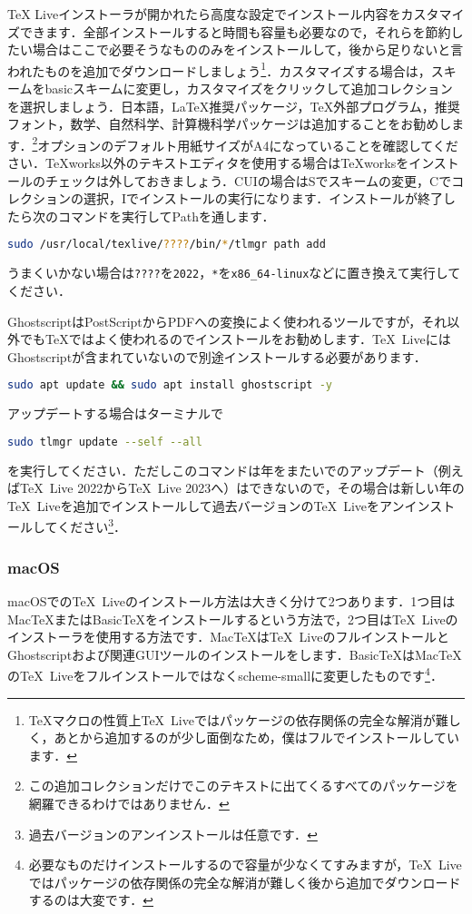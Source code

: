 TeX Liveインストーラが開かれたら高度な設定でインストール内容をカスタマイズできます．全部インストールすると時間も容量も必要なので，それらを節約したい場合はここで必要そうなもののみをインストールして，後から足りないと言われたものを追加でダウンロードしましょう\footnote{\TeX マクロの性質上\TeX\ Liveではパッケージの依存関係の完全な解消が難しく，あとから追加するのが少し面倒なため，僕はフルでインストールしています．}．カスタマイズする場合は，スキームをbasicスキームに変更し，カスタマイズをクリックして追加コレクションを選択しましょう．日本語，LaTeX推奨パッケージ，TeX外部プログラム，推奨フォント，数学、自然科学、計算機科学パッケージは追加することをお勧めします．\footnote{この追加コレクションだけでこのテキストに出てくるすべてのパッケージを網羅できるわけではありません．}オプションのデフォルト用紙サイズがA4になっていることを確認してください．TeXworks以外のテキストエディタを使用する場合はTeXworksをインストールのチェックは外しておきましょう．CUIの場合はSでスキームの変更，Cでコレクションの選択，Iでインストールの実行になります．インストールが終了したら次のコマンドを実行してPathを通します．
\begin{lstlisting}[language=bash]
sudo /usr/local/texlive/????/bin/*/tlmgr path add
\end{lstlisting}
うまくいかない場合は\texttt{????}を\texttt{2022}，\texttt{*}を\texttt{x86\_64-linux}などに置き換えて実行してください．

GhostscriptはPostScriptからPDFへの変換によく使われるツールですが，それ以外でも\TeX ではよく使われるのでインストールをお勧めします．\TeX\ LiveにはGhostscriptが含まれていないので別途インストールする必要があります．
\begin{lstlisting}[language=bash]
sudo apt update && sudo apt install ghostscript -y
\end{lstlisting}

アップデートする場合はターミナルで
\begin{lstlisting}[language=bash]
sudo tlmgr update --self --all
\end{lstlisting}
を実行してください．ただしこのコマンドは年をまたいでのアップデート（例えば\TeX\ Live 2022から\TeX\ Live 2023へ）はできないので，その場合は新しい年の\TeX\ Liveを追加でインストールして過去バージョンの\TeX\ Liveをアンインストールしてください\footnote{過去バージョンのアンインストールは任意です．}．

\subsubsection*{macOS}
macOSでの\TeX\ Liveのインストール方法は大きく分けて2つあります．1つ目はMac\TeX またはBasic\TeX をインストールするという方法で，2つ目は\TeX\ Liveのインストーラを使用する方法です．Mac\TeX は\TeX\ LiveのフルインストールとGhostscriptおよび関連GUIツールのインストールをします．Basic\TeX はMac\TeX の\TeX\ Liveをフルインストールではなくscheme-smallに変更したものです\footnote{必要なものだけインストールするので容量が少なくてすみますが，\TeX\ Liveではパッケージの依存関係の完全な解消が難しく後から追加でダウンロードするのは大変です．}．

